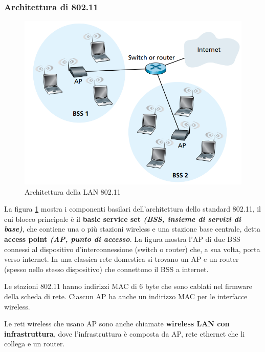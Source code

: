\documentclass[11pt,a4paper]{article}
\begin{document}
{\subsubsection{Architettura di 802.11}
\begin{figure}
	\includegraphics[scale=0.6]{img/095.png}
	\caption{Architettura della LAN 802.11}
	\label{fig: 095}
\end{figure}
La figura \ref{fig: 095} mostra i componenti basilari dell'architettura dello standard 802.11, il cui blocco principale è il \textbf{basic service set \textit{(BSS, insieme di servizi di base)}}, che contiene una o più stazioni wireless e una stazione base centrale, detta \textbf{access point \textit{(AP, punto di accesso}}. La figura mostra l'AP di due BSS connessi al dispositivo d'interconnessione (switch o router) che, a sua volta, porta verso internet. In una classica rete domestica si trovano un AP e un router (spesso nello stesso dispositivo) che connettono il BSS a internet.

Le stazioni 802.11 hanno indirizzi MAC di 6 byte che sono cablati nel firmware della scheda di rete. Ciascun AP ha anche un indirizzo MAC per le interfacce wireless.

Le reti wireless che usano AP sono anche chiamate \textbf{wireless LAN con infrastruttura}, dove l'infrastruttura è composta da AP, rete ethernet che li collega e un router.

}
\end{document}
